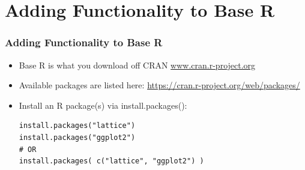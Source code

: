\section{Adding Functionality to Base R}

\begin{frame}[fragile]
	\frametitle{Adding Functionality to Base R}

	\begin{itemize}
		\item Base R is what you download off CRAN \url{www.cran.r-project.org} 
		\item Available packages are listed here: \url{https://cran.r-project.org/web/packages/}
		\item Install an R package(s) via \ttfamily install.packages(): \normalfont 
   	\begin{lstlisting}
install.packages("lattice")
install.packages("ggplot2")
# OR
install.packages( c("lattice", "ggplot2") )

	\end{lstlisting}
	\end{itemize} 	
\end{frame}



